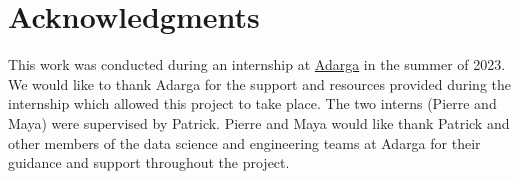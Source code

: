 \section*{Acknowledgments}

This work was conducted during an internship at \href{https://adarga.ai/}{Adarga} in the summer of 2023. We would like to thank Adarga for the support and resources provided during the internship which allowed this project to take place. The two interns (Pierre and Maya) were supervised by Patrick. Pierre and Maya would like thank Patrick and other members of the data science and engineering teams at Adarga for their guidance and support throughout the project.